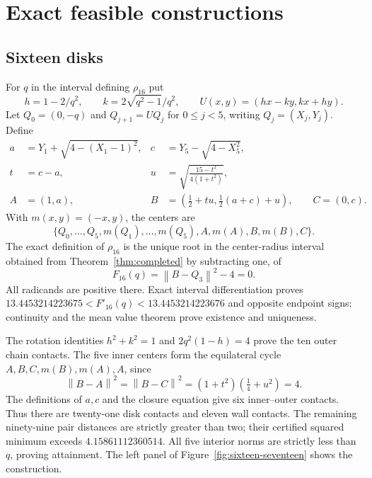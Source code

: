 \documentclass[11pt]{amsart}
\theoremstyle{definition}
\theoremstyle{remark}
\newcommand{\norm}[1]{\left\lVert #1\right\rVert}
\newcommand{\rhoSixteen}{\rho_{16}}
\begin{document}
\section{Exact feasible constructions}
\subsection{Sixteen disks}\label{sec:sixteen}
For $q$ in the interval defining $\rhoSixteen$ put
\[
h=1-2/q^2,\qquad k=2\sqrt{q^2-1}/q^2,\qquad
U(x,y)=(hx-ky,kx+hy).
\]
Let $Q_0=(0,-q)$ and $Q_{j+1}=UQ_j$ for $0\le j<5$, writing
$Q_j=(X_j,Y_j)$. Define
\begin{align*}
a&=Y_1+\sqrt{4-(X_1-1)^2}, & c&=Y_5-\sqrt{4-X_5^2},\\
t&=c-a, & u&=\sqrt{\frac{15-t^2}{4(1+t^2)}},\\
A&=(1,a), & B&=(\tfrac12+tu,\tfrac12(a+c)+u),\qquad C=(0,c).
\end{align*}
With $m(x,y)=(-x,y)$, the centers are
\[
\{Q_0,\ldots,Q_5,m(Q_1),\ldots,m(Q_5),A,m(A),B,m(B),C\}.
\]
The exact definition of $\rhoSixteen$ is the unique root in the center-radius
interval obtained from Theorem~\ref{thm:completed} by subtracting one, of
\[
 F_{16}(q)=\norm{B-Q_3}^2-4=0.
\]
All radicands are positive there. Exact interval differentiation proves
$13.4453214223675<F'_{16}(q)<13.4453214223676$ and opposite endpoint signs;
continuity and the mean value theorem prove existence and uniqueness.

The rotation identities $h^2+k^2=1$ and $2q^2(1-h)=4$ prove the ten outer
chain contacts. The five inner centers form the equilateral cycle
$A,B,C,m(B),m(A),A$, since
\[
\norm{B-A}^2=\norm{B-C}^2=(1+t^2)(\tfrac14+u^2)=4.
\]
The definitions of $a,c$ and the closure equation give six inner--outer
contacts. Thus there are twenty-one disk contacts and eleven wall contacts.
The remaining ninety-nine pair distances are strictly greater than two;
their certified squared minimum exceeds $4.15861112360514$.
All five interior norms are strictly less than $q$, proving attainment.
The left panel of Figure~\ref{fig:sixteen-seventeen} shows the construction.
\end{document}
